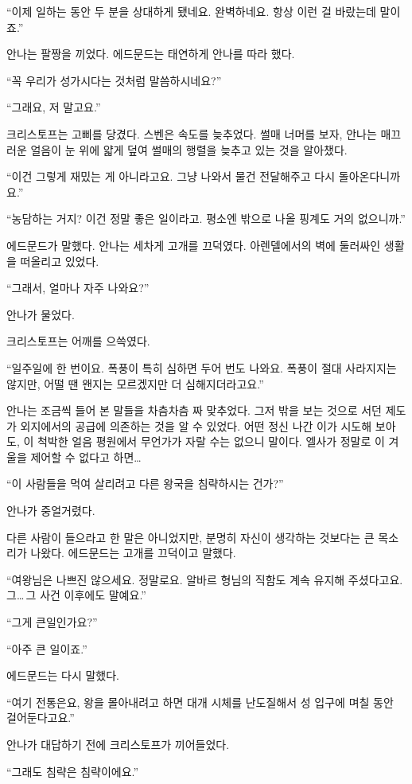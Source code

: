 ``이제 일하는 동안 두 분을 상대하게 됐네요. 완벽하네요. 항상 이런 걸 바랐는데 말이죠.''

안나는 팔짱을 끼었다. 에드문드는 태연하게 안나를 따라 했다.

``꼭 우리가 성가시다는 것처럼 말씀하시네요?''

``그래요, 저 말고요.''

크리스토프는 고삐를 당겼다. 스벤은 속도를 늦추었다. 썰매 너머를 보자, 안나는 매끄러운 얼음이 눈 위에 얇게 덮여 썰매의 행렬을 늦추고 있는 것을 알아챘다.

``이건 그렇게 재밌는 게 아니라고요. 그냥 나와서 물건 전달해주고 다시 돌아온다니까요.''

``농담하는 거지? 이건 정말 좋은 일이라고. 평소엔 밖으로 나올 핑계도 거의 없으니까.''

에드문드가 말했다. 안나는 세차게 고개를 끄덕였다. 아렌델에서의 벽에 둘러싸인 생활을 떠올리고 있었다.

``그래서, 얼마나 자주 나와요?''

안나가 물었다.

크리스토프는 어깨를 으쓱였다.

``일주일에 한 번이요. 폭풍이 특히 심하면 두어 번도 나와요. 폭풍이 절대 사라지지는 않지만, 어떨 땐 왠지는 모르겠지만 더 심해지더라고요.''

안나는 조금씩 들어 본 말들을 차츰차츰 짜 맞추었다. 그저 밖을 보는 것으로 서던 제도가 외지에서의 공급에 의존하는 것을 알 수 있었다. 어떤 정신 나간 이가 시도해 보아도, 이 척박한 얼음 평원에서 무언가가 자랄 수는 없으니 말이다. 엘사가 정말로 이 겨울을 제어할 수 없다고 하면\ldots

``이 사람들을 먹여 살리려고 다른 왕국을 침략하시는 건가?''

안나가 중얼거렸다.

다른 사람이 들으라고 한 말은 아니었지만, 분명히 자신이 생각하는 것보다는 큰 목소리가 나왔다. 에드문드는 고개를 끄덕이고 말했다.

``여왕님은 나쁘진 않으세요. 정말로요. 알바르 형님의 직함도 계속 유지해 주셨다고요. 그\ldots\,그 사건 이후에도 말예요.''

``그게 큰일인가요?''

``아주 큰 일이죠.''

에드문드는 다시 말했다.

``여기 전통은요, 왕을 몰아내려고 하면 대개 시체를 난도질해서 성 입구에 며칠 동안 걸어둔다고요.''

안나가 대답하기 전에 크리스토프가 끼어들었다.

``그래도 침략은 침략이에요.''


